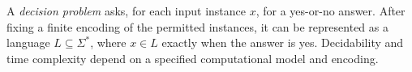 
A \emph{decision problem} asks, for each input instance $x$, for a yes-or-no answer. After fixing a finite encoding of the permitted instances, it can be represented as a language $L\subseteq\Sigma^*$, where $x\in L$ exactly when the answer is yes. Decidability and time complexity depend on a specified computational model and encoding.
